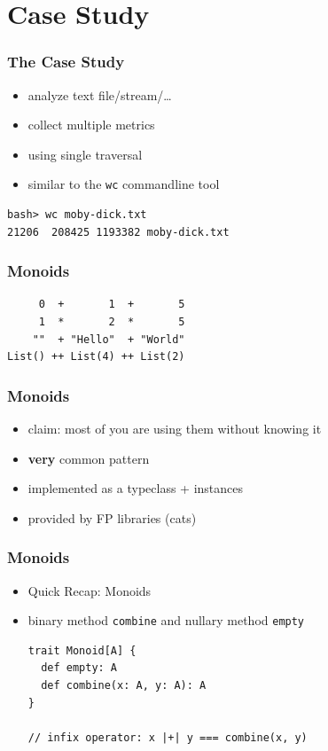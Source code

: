 \documentclass[aspectratio=169]{beamer}
\begin{document}
\section{Case Study}

\begin{frame}[fragile]
  \frametitle{The Case Study}
  \begin{itemize}
  \item analyze text file/stream/\ldots{}
  \item collect multiple metrics
  \item using single traversal
  \item similar to the \texttt{wc} commandline tool
  \end{itemize}
  \begin{verbatim}
bash> wc moby-dick.txt
21206  208425 1193382 moby-dick.txt
  \end{verbatim}
\end{frame}

\begin{frame}[fragile]
  \frametitle{Monoids}
  \begin{center}
    \begin{verbatim}
     0  +       1  +       5
     1  *       2  *       5
    ""  + "Hello"  + "World"
List() ++ List(4) ++ List(2)
    \end{verbatim}
  \end{center}
\end{frame}

\begin{frame}
  \frametitle{Monoids}
  \begin{itemize}
  \item claim: most of you are using them without knowing it
  \item \textbf{very} common pattern
  \item implemented as a typeclass + instances
  \item provided by FP libraries (cats)
  \end{itemize}
\end{frame}

\begin{frame}[fragile]
  \frametitle{Monoids}
  \begin{itemize}
  \item Quick Recap: Monoids
  \item binary method \texttt{combine} and nullary method \texttt{empty}
    \vspace{1cm}
    \begin{verbatim}
trait Monoid[A] {
  def empty: A
  def combine(x: A, y: A): A
}

// infix operator: x |+| y === combine(x, y)
    \end{verbatim}
  \end{itemize}
\end{frame}
\end{document}
